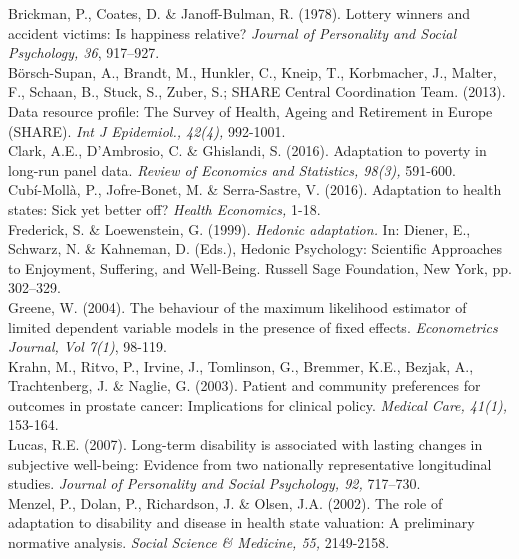 \documentclass[12pt]{article}
\begin{document}
\noindent Brickman, P., Coates, D. \& Janoff-Bulman, R. (1978). Lottery winners and accident victims: Is happiness relative? \textit{Journal of Personality and Social Psychology, 36}, 917–927.\\

\noindent Börsch-Supan, A., Brandt, M., Hunkler, C., Kneip, T., Korbmacher, J., Malter, F., Schaan, B., Stuck, S., Zuber, S.; SHARE Central Coordination Team. (2013). Data resource profile: The Survey of Health, Ageing and Retirement in Europe (SHARE). \textit{Int J Epidemiol., 42(4),} 992-1001. \\

\noindent Clark, A.E., D’Ambrosio, C. \& Ghislandi, S. (2016). Adaptation to poverty in long-run panel data. \textit{Review of Economics and Statistics, 98(3),} 591-600.\\

\noindent Cub\'i-Moll\`a, P., Jofre-Bonet, M. \& Serra-Sastre, V. (2016). Adaptation to health states: Sick yet better off? \textit{Health Economics,} 1-18.\\

\noindent Frederick, S. \& Loewenstein, G. (1999). \textit{Hedonic adaptation.} In: Diener, E., Schwarz, N. \& Kahneman, D. (Eds.), Hedonic Psychology: Scientific Approaches to Enjoyment, Suffering, and Well-Being. Russell Sage Foundation, New York, pp. 302–329.\\

\noindent Greene, W. (2004). The behaviour of the maximum likelihood estimator of limited
dependent variable models in the presence of fixed effects. \textit{Econometrics Journal, Vol 7(1)}, 98-119.\\

\noindent Krahn, M., Ritvo, P., Irvine, J., Tomlinson, G., Bremmer, K.E., Bezjak, A., Trachtenberg, J. \& Naglie, G. (2003). Patient and community preferences for outcomes in prostate cancer: Implications for clinical policy. \textit{Medical Care, 41(1),} 153-164.\\ 

\noindent Lucas, R.E. (2007). Long-term disability is associated with lasting changes in subjective well-being: Evidence from two nationally representative longitudinal studies. \textit{Journal of Personality and Social Psychology, 92,} 717–730.\\

\noindent Menzel, P., Dolan, P., Richardson, J. \& Olsen, J.A. (2002). The role of adaptation to disability and disease in health state valuation: A preliminary normative analysis. \textit{Social Science \& Medicine, 55,} 2149-2158.\\
\end{document}
